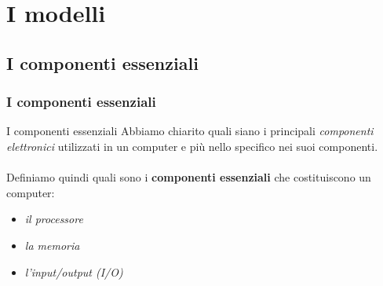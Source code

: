 \section[I modelli]{I modelli}
\label{sec:models}


\subsection[I componenti essenziali]{I componenti essenziali}
\begin{frame}
	\frametitle{I componenti essenziali}
	
	\begin{block}{I componenti essenziali}
		Abbiamo chiarito quali siano i principali \textit{componenti elettronici} utilizzati in un computer e più nello specifico nei suoi componenti.\\~\\
		Definiamo quindi quali sono i \textbf{componenti essenziali} che costituiscono un computer:
		\begin{itemize}
			\item \textit{il processore}
			\item \textit{la memoria}
			\item \textit{l'input/output (I/O)}
		\end{itemize}
		
	\end{block}
	
\end{frame}



%	
%	
%	



